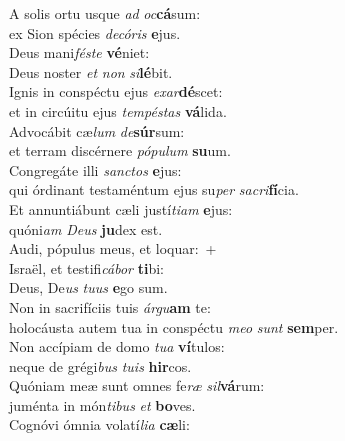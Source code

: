 \evenverse A solis ortu usque \textit{ad} \textit{oc}\textbf{cá}sum:~\*\\
\evenverse ex Sion spécies \textit{de}\textit{có}\textit{ris} \textbf{e}jus.\\
\oddverse Deus mani\textit{fé}\textit{ste} \textbf{vé}niet:~\*\\
\oddverse Deus noster \textit{et} \textit{non} \textit{si}\textbf{lé}bit.\\
\evenverse Ignis in conspéctu ejus \textit{e}\textit{xar}\textbf{dé}scet:~\*\\
\evenverse et in circúitu ejus \textit{tem}\textit{pé}\textit{stas} \textbf{vá}lida.\\
\oddverse Advocábit cæ\textit{lum} \textit{de}\textbf{súr}sum:~\*\\
\oddverse et terram discérnere \textit{pó}\textit{pu}\textit{lum} \textbf{su}um.\\
\evenverse Congregáte illi \textit{san}\textit{ctos} \textbf{e}jus:~\*\\
\evenverse qui órdinant testaméntum ejus su\textit{per} \textit{sa}\textit{cri}\textbf{fí}cia.\\
\oddverse Et annuntiábunt cæli justí\textit{ti}\textit{am} \textbf{e}jus:~\*\\
\oddverse quóni\textit{am} \textit{De}\textit{us} \textbf{ju}dex est.\\
\evenverse Audi, pópulus meus, et loquar:~+\\
\evenverse  Israël, et testifi\textit{cá}\textit{bor} \textbf{ti}bi:~\*\\
\evenverse Deus, De\textit{us} \textit{tu}\textit{us} \textbf{e}go sum.\\
\oddverse Non in sacrifíciis tuis \textit{ár}\textit{gu}\textbf{am} te:~\*\\
\oddverse holocáusta autem tua in conspéctu \textit{me}\textit{o} \textit{sunt} \textbf{sem}per.\\
\evenverse Non accípiam de domo \textit{tu}\textit{a} \textbf{ví}tulos:~\*\\
\evenverse neque de grégi\textit{bus} \textit{tu}\textit{is} \textbf{hir}cos.\\
\oddverse Quóniam meæ sunt omnes fe\textit{ræ} \textit{sil}\textbf{vá}rum:~\*\\
\oddverse juménta in món\textit{ti}\textit{bus} \textit{et} \textbf{bo}ves.\\
\evenverse Cognóvi ómnia volatí\textit{li}\textit{a} \textbf{cæ}li:~\*\\
